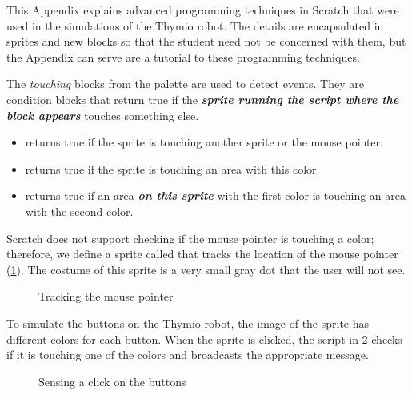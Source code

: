 \label{ch.implementation}

This Appendix explains advanced programming techniques in Scratch that
were used in the simulations of the Thymio robot. The details are
encapsulated in sprites and new blocks so that the student need not be
concerned with them, but the Appendix can serve are a tutorial to these
programming techniques.


The \emph{touching} blocks from the  palette are used to
detect events. They are condition blocks that return true if the
\textbf{\emph{sprite running the script where the block appears}}
touches something else.

\begin{itemize}
\item {} returns true if the sprite is touching another
sprite or the mouse pointer.

\item {} returns true if the sprite is touching an area
with this color.

\item {} returns true if an area
\textbf{\emph{on this sprite}} with the first color is touching an area
with the second color.

\end{itemize}


Scratch does not support checking if the mouse pointer is touching
a color; therefore, we define a sprite called  that tracks
the location of the mouse pointer (\cref{fig.track}). The costume of
this sprite is a very small gray dot that the user will not see.

\begin{figure}[htb]
\caption{Tracking the mouse pointer}\label{fig.track}
\end{figure}

To simulate the buttons on the Thymio robot, the image of the 
sprite has different colors for each button. When the  sprite
is clicked, the script in \cref{fig.buttons} checks if it is touching
one of the colors and broadcasts the appropriate message.

\begin{figure}[htb]
\caption{Sensing a click on the buttons}\label{fig.buttons}
\end{figure}


